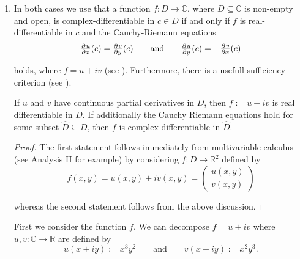 \begin{enumerate}[label = \textbf{Exercise \arabic*.},wide = 0pt, itemsep=1.5ex]
	\begin{proof}
		$h$ aswell as $h^{-1}$ are well-defined rational functions, hence holomorphic in their respective domains.		
	\end{proof}
	
	By lemma \ref{lem:well_defined}, \ref{lem:invertible} and \ref{lem:holo} we conclude that the Cayley-map is biholomorphic. 

\item In both cases we use that a function $f: D \to \mathbb{C}$, where $D \subseteq \mathbb{C}$ is non-empty and open, is complex-differentiable in $c \in D$ if and only if $f$ is real-differentiable in $c$ and the Cauchy-Riemann equations 
	\begin{equation*}
		\pd{u}{x}(c) = \pd{v}{y}(c) \qquad \text{and} \qquad \pd{u}{y}(c) = -\pd{v}{x}(c)
	\end{equation*}

	\noindent holds, where $f = u + iv$ (see \cite[47]{remmert2002funktionentheorie}). Furthermore, there is a usefull sufficiency criterion (see \cite[48]{remmert2002funktionentheorie}).	
	\begin{lemma}
		If $u$ and $v$ have continuous partial derivatives in $D$, then $f := u + iv$ is real differentiable in $D$. If additionally the Cauchy Riemann equations hold for some subset $\hat{D} \subseteq D$, then $f$ is complex differentiable in $\hat{D}$.
	\end{lemma}

	\begin{proof}
		The first statement follows immediately from multivariable calculus (see Analysis II for example) by considering $f: D \to \mathbb{R}^2$ defined by 
		\begin{equation*}
			f(x,y) = u(x,y) + iv(x,y) = \begin{pmatrix}
				u(x,y)\\
				v(x,y)
			\end{pmatrix}
		\end{equation*}
	
		\noindent whereas the second statement follows from the above discussion.
	\end{proof}

	First we consider the function $f$. We can decompose $f = u + iv$ where $u,v: \mathbb{C} \to \mathbb{R}$ are defined by
	\begin{equation}
		u(x + iy) := x^3y^2 \qquad \text{and} \qquad v(x + iy) := x^2y^3.	
	\end{equation}


\end{enumerate}

